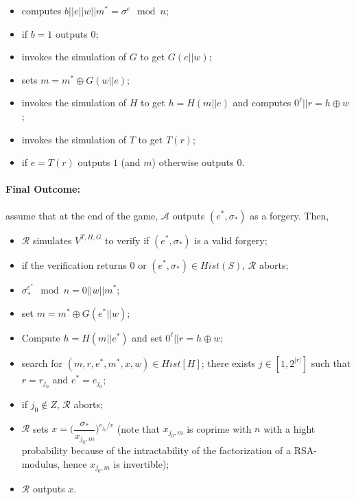 \documentclass[a4paper,11pt]{article}
\begin{document}
 \begin{itemize}
 \item computes $b||e||w||m^* = \sigma^{e} \mod n$;
 \item if $b = 1$ outputs $0$;
 \item invokes the simulation of $G$ to get $G(e||w)$;
 \item sets $m= m^*\oplus G(w||e)$;
 \item invokes the simulation of  $H$ to get  $h=H(m||e)$ and computes $0^{\ell}||r=h\oplus w$;
 \item invokes the simulation of  $T$ to get  $T(r)$;
 \item if $e=T(r)$   outputs $1$ (and $m$)
otherwise outputs $0$.
\end{itemize}

\paragraph{Final Outcome:} assume that at the end of the game, $\mathcal{A}$ outputs $(e^{*}, \sigma_{*})$ as a
forgery. Then,
 \begin{itemize}
 \item     $\mathcal{R}$ simulates $V^{T,H,G}$ to verify if $(e^{*}, \sigma_{*})$ is a valid forgery;
\item if the verification returns $0$ or $(e^{*}, \sigma_{*}) \in  Hist(S)$,  $\mathcal{R}$ aborts;
\item $\sigma_{*}^{e^{*}} \mod n = 0||w||m^*$;
\item set $m = m^*\oplus  G(e^{*}||w)$;
\item Compute $h=H(m||e^{*})$ and set $0^{\ell}||r = h\oplus w$;
\item search for $(m, r, e^{*}, m^*, x, w) \in Hist [H]$; there exists $j\in [1,2^{|r|}]$ such that $r=r_{j_{0}}$ and $e^{*}=e_{j_{0}}$;
 \item if $j_{0} \notin Z$, $\mathcal{R}$ aborts;
  \item     $\mathcal{R}$ sets $ x = \big(\dfrac{\sigma_{*}}{x_{j_{0},m}}\big)^{e_{j_{0}}/v}$  (note that $x_{j_{0},m}$ is coprime with $n$ with a hight probability because of the intractability of the factorization of a RSA-modulus, hence $x_{j_{0},m}$ is invertible);
  \item    $\mathcal{R}$ outputs $x$.
\end{itemize}
\end{document}
